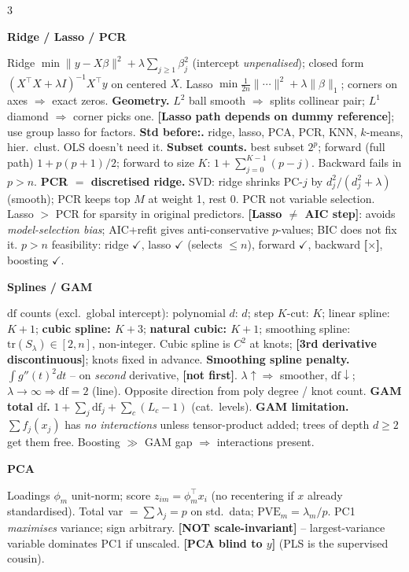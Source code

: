 \documentclass[a4paper,8pt]{extarticle}
\renewcommand{\section}[1]{\par\vspace{2pt}\noindent\colorbox{black!15}{\parbox{0.97\linewidth}{\strut\bfseries\small #1}}\par\vspace{1pt}}
\newcommand{\hd}[1]{\textbf{#1.}}
\newcommand{\tr}[1]{\textcolor{red!70!black}{\textbf{[#1]}}} %
\newcommand{\df}{\mathrm{df}}
\newcommand{\Tr}{\mathrm{tr}}
\begin{document}
\begin{multicols*}{3}
\section{Ridge / Lasso / PCR}
Ridge $\min\|y-X\beta\|^2+\lambda\sum_{j\ge1}\beta_j^2$ (intercept \emph{unpenalised}); closed form $(X^\top X+\lambda I)^{-1}X^\top y$ on centered $X$.
Lasso $\min\tfrac{1}{2n}\|\cdots\|^2+\lambda\|\beta\|_1$; corners on axes $\Rightarrow$ exact zeros.
\hd{Geometry} $L^2$ ball smooth $\Rightarrow$ splits collinear pair; $L^1$ diamond $\Rightarrow$ corner picks one. \tr{Lasso path depends on dummy reference}; use group lasso for factors.
\hd{Std before:} ridge, lasso, PCA, PCR, KNN, $k$-means, hier.\ clust. OLS doesn't need it.
\hd{Subset counts} best subset $2^p$; forward (full path) $1+p(p+1)/2$; forward to size $K$: $1+\sum_{j=0}^{K-1}(p-j)$. Backward fails in $p>n$.
\hd{PCR $=$ discretised ridge} SVD: ridge shrinks PC-$j$ by $d_j^2/(d_j^2+\lambda)$ (smooth); PCR keeps top $M$ at weight 1, rest 0. PCR not variable selection. Lasso $>$ PCR for sparsity in original predictors.
\tr{Lasso $\ne$ AIC step}: avoids \emph{model-selection bias}; AIC+refit gives anti-conservative $p$-values; BIC does not fix it.
$p\!>\!n$ feasibility: ridge $\checkmark$, lasso $\checkmark$ (selects $\le n$), forward $\checkmark$, backward \tr{$\times$}, boosting $\checkmark$.

\section{Splines / GAM}
$\df$ counts (excl.\ global intercept): polynomial $d$: $d$; step $K$-cut: $K$; linear spline: $K+1$; \textbf{cubic spline: $K+3$}; \textbf{natural cubic: $K+1$}; smoothing spline: $\Tr(S_\lambda)\in[2,n]$, non-integer.
Cubic spline is $C^2$ at knots; \tr{3rd derivative discontinuous}; knots fixed in advance.
\hd{Smoothing spline penalty} $\int g''(t)^2dt$ -- on \emph{second} derivative, \tr{not first}.
$\lambda\uparrow\Rightarrow$ smoother, $\df\downarrow$; $\lambda\to\infty\Rightarrow\df=2$ (line). Opposite direction from poly degree / knot count.
\hd{GAM total $\df$} $1+\sum_j\df_j+\sum_c(L_c-1)$ (cat.\ levels).
\hd{GAM limitation} $\sum f_j(x_j)$ has \emph{no interactions} unless tensor-product added; trees of depth $d\ge2$ get them free. Boosting $\gg$ GAM gap $\Rightarrow$ interactions present.

\section{PCA}
Loadings $\phi_m$ unit-norm; score $z_{im}=\phi_m^\top x_i$ (no recentering if $x$ already standardised). Total var $=\sum\lambda_j=p$ on std.\ data; $\text{PVE}_m=\lambda_m/p$. PC1 \emph{maximises} variance; sign arbitrary.
\tr{NOT scale-invariant} -- largest-variance variable dominates PC1 if unscaled.
\tr{PCA blind to $y$} (PLS is the supervised cousin).


\end{multicols*}
\end{document}
